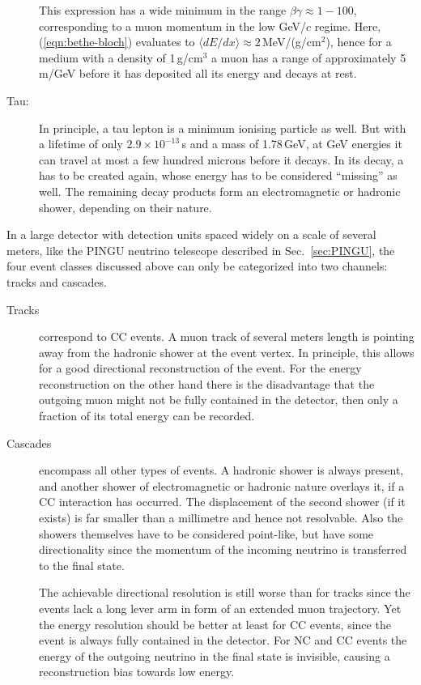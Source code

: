 \begin{description}
  This expression has a wide minimum in the range $\beta\gamma\approx 1 - 100$, 
  corresponding to a muon momentum in the low GeV/$c$ regime. Here,
  (\ref{eqn:bethe-bloch}) evaluates to $\langle dE/dx\rangle \approx
  2$\,MeV/(g/cm$^2$), hence for a medium with a density of 1\,g/cm$^3$ a muon
  has a range of approximately 5\,m/GeV before it has deposited all its energy
  and decays at rest.
 \item[Tau:] In principle, a tau lepton is a minimum ionising particle as well.
  But with a lifetime of only $2.9\times10^{-13}$\,s and a mass of 1.78\,GeV, at
  GeV energies it can travel at most a few hundred microns before it decays. In
  its decay, a \nutau has to be created again, whose energy has to be considered
  ``missing'' as well. The remaining decay products form an electromagnetic or
  hadronic shower, depending on their nature.
\end{description}

In a large detector with detection units spaced widely on a scale of several 
meters, like the PINGU neutrino telescope described in Sec.~\ref{sec:PINGU}, the
four event classes discussed above can only be categorized into two channels: 
tracks and cascades. 
\begin{description}
 \item[Tracks] correspond to \numu CC events. A muon track of several meters 
  length is pointing away from the hadronic shower at the event vertex. In 
  principle, this allows for a good directional reconstruction of the event. 
  For the energy reconstruction on the other hand there is the disadvantage 
  that the outgoing muon might not be fully contained in the detector, then 
  only a fraction of its total energy can be recorded.
 \item[Cascades] encompass all other types of events. A hadronic shower is 
  always present, and another shower of electromagnetic or hadronic nature 
  overlays it, if a CC interaction has occurred. The displacement of the second 
  shower (if it exists) is far smaller than a millimetre and hence not 
  resolvable. Also the showers themselves have to be considered point-like, but 
  have some directionality since the momentum of the incoming neutrino is 
  transferred to the final state. 
  
  The achievable directional resolution is still worse than for tracks since 
  the events lack a long lever arm in form of an extended muon trajectory. Yet 
  the energy resolution should be better at least for \nue CC events, since the 
  event is always fully contained in the detector. For NC and \nutau CC events 
  the energy of the outgoing neutrino in the final state is invisible, causing 
  a reconstruction bias towards low energy.
\end{description}



